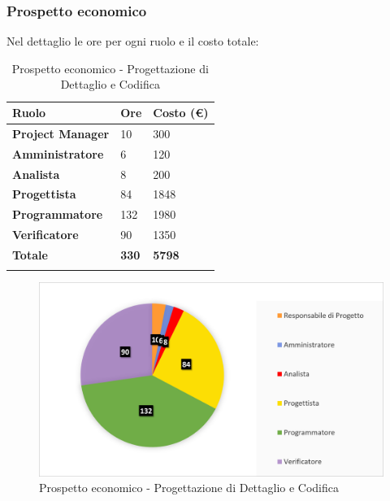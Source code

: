 \subsubsection{Prospetto economico}
Nel dettaglio le ore per ogni ruolo e il costo totale: 
\begin{center}
	\def\arraystretch{1.6}
	\bgroup
	\begin{longtable}{| p{4cm} | p{1cm} | p{2cm} |}
		\hline
		\textbf{Ruolo} & \textbf{Ore} & \textbf{Costo (€)} \\ 
		
		\hline \hline  
		
		\textbf{Project Manager} & {10} & {300} \\ 
		\hline 
		
		\textbf{Amministratore} & {6} & {120} \\ 
		\hline 
		
		\textbf{Analista} & {8} & {200} \\ 
		\hline 
		
		\textbf{Progettista} & {84} & {1848} \\ 
		\hline 
		
		\textbf{Programmatore} & {132} & {1980} \\ 
		\hline 
		
		\textbf{Verificatore} & {90} & {1350} \\ 
		\hline 
		
		\textbf{Totale} & \textbf{330} & \textbf{5798} \\ 
		\hline 
		
		
		\hline 
		
		\caption{Prospetto economico - Progettazione di Dettaglio e Codifica}
	\end{longtable}
	\egroup
\end{center}
\begin{figure}[H]
	\centering
	\includegraphics[width= 14cm]{immagini/pdc_torta.png}
	\caption{Prospetto economico - Progettazione di Dettaglio e Codifica}
\end{figure}
\newpage


